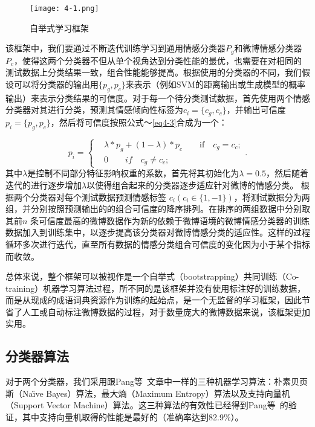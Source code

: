 \begin{landscape}
\begin{figure*}[htp] 
\centering%
\texttt{[image: 4-1.png]}
\caption{自举式学习框架}
\label{fig4-1}
\end{figure*}
\end{landscape}
该框架中，我们要通过不断迭代训练学习到通用情感分类器$ P_{g} $和微博情感分类器$ P_{c} $，使得这两个分类器不但从单个视角达到分类性能的最优，也需要在对相同的测试数据上分类结果一致，组合性能能够提高。根据使用的分类器的不同，我们假设可以将分类器的输出用$  \lbrace p_{g},p_{c}\rbrace$来表示（例如SVM的距离输出或生成模型的概率输出）来表示分类结果的可信度。对于每一个待分类测试数据，首先使用两个情感分类器对其进行分类，预测其情感倾向性标签为$ c_{i}=\lbrace c_{g},c_{c}\rbrace $，并输出可信度$ p_{i}= \lbrace p_{g},p_{c}\rbrace$，然后将可信度按照公式～\ref{eq4-3}合成为一个：

\begin{equation}
\label{eq4-3}
p_{i}=\begin{cases}
& \lambda\ast p_{g} + \left( 1-\lambda \right) \ast p_{c} \qquad \mbox{if} \quad c_{g}=c_{c};\\
& 0 \qquad \textit{if} \quad c_{g} \neq c_{c};
\end{cases}.
\end{equation}
其中$ \lambda $是控制不同部分特征影响权重的系数，首先将其初始化为$ \lambda = 0.5 $，然后随着迭代的进行逐步增加$ \lambda $以使得组合起来的分类器逐步适应针对微博的情感分类。
根据两个分类器对每个测试数据预测情感标签 $ c_{i} \left( c_{i} \in \lbrace 1, -1\rbrace \right)$，将测试数据分为两组，并分别按照预测输出的的组合可信度的降序排列。在排序的两组数据中分别取其前$ n $ 条可信度最高的微博数据作为新的依赖于微博语境的微博情感分类器的训练数据加入到训练集中，以逐步提高该分类器对微博情感分类的适应性。这样的过程循环多次进行迭代，直至所有数据的情感分类组合可信度的变化因为小于某个指标而收敛。

总体来说，整个框架可以被视作是一个自举式（bootstrapping）共同训练（Co-training）机器学习算法过程，所不同的是该框架并没有使用标注好的训练数据，而是从现成的成语词典资源作为训练的起始点，是一个无监督的学习框架，因此节省了人工或自动标注微博数据的过程，对于数量庞大的微博数据来说，该框架更加实用。

\subsection{分类器算法}
\label{classifier}
对于两个分类器，我们采用跟Pang等~\cite{Pang2002}文章中一样的三种机器学习算法：朴素贝页斯（Na\"\i ve Bayes）算法，最大熵（Maximum Entropy）算法以及支持向量机（Support Vector Machine）算法。这三种算法的有效性已经得到Pang等~\cite{Pang2002}的验证，其中支持向量机取得的性能是最好的（准确率达到82.9\%）。

